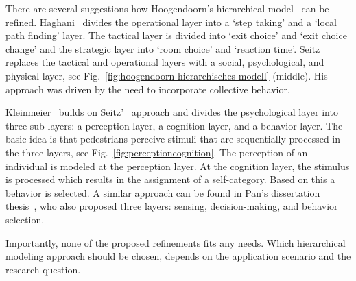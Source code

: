 There are several suggestions how Hoogendoorn's hierarchical model~\cite{hoogendoorn-2004-cdyn} can be refined. 
Haghani~\cite{haghani-2023-cdyn} divides the operational layer into a `step taking' and a `local path finding' layer. The tactical layer is divided into `exit choice' and `exit choice change' and the strategic layer into `room choice' and `reaction time'. 
Seitz~\cite{seitz-2016-cdyn} replaces the tactical and operational layers with a social, psychological, and physical layer, see Fig.~\ref{fig:hoogendoorn-hierarchisches-modell} (middle). His approach was driven by the need to incorporate collective behavior. 


Kleinmeier~\cite{kleinmeier-2021-cdyn} builds on Seitz'~\cite{seitz-2016-cdyn} approach and divides the psychological layer into three sub-layers: a perception layer, a cognition layer, and a behavior layer. The basic idea is that pedestrians perceive stimuli that are  sequentially processed in the three layers, see Fig.~\ref{fig:perceptioncognition}. The perception of an individual is modeled at the perception layer. At the cognition layer, the stimulus is processed which results in the assignment of a self-category. Based on this a behavior is selected. A similar approach can be found in Pan's dissertation thesis~\cite{pan-2006-cdyn}, who also proposed three layers: sensing, decision-making, and behavior selection. 

Importantly, none of the proposed refinements fits any needs. Which hierarchical modeling approach should be chosen, depends on the application scenario and the research question.



